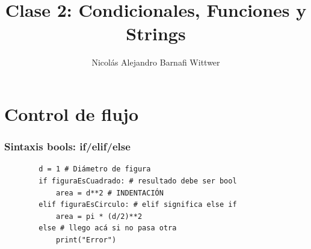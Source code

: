 \documentclass[14pt,aspectratio=169,xcolor=dvipsnames]{beamer}
\title[short title]{Clase 2: Condicionales, Funciones y Strings}
\subtitle{}
\author[NA Barnafi] {Nicolás Alejandro Barnafi Wittwer}
\institute[UC|CMM] 
{
    Pontificia Universidad Católica de Chile \\
    Centro de Modelamiento Matemático
}
\date{}
\begin{document}
\begin{frame}
    \maketitle
\end{frame}
\section{Control de flujo}
\begin{frame}[fragile]\frametitle{Sintaxis bools: if/elif/else}

    \begin{verbatim}
        d = 1 # Diámetro de figura
        if figuraEsCuadrado: # resultado debe ser bool
            area = d**2 # INDENTACIÓN
        elif figuraEsCirculo: # elif significa else if
            area = pi * (d/2)**2
        else # llego acá si no pasa otra
            print("Error")
    \end{verbatim}    
\end{frame}
\end{document}

